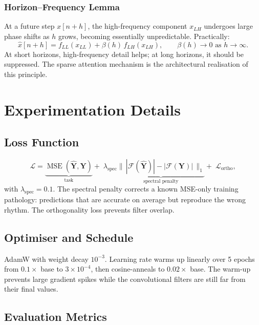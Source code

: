 \documentclass[11pt, letterpaper]{article}
\begin{document}
\subsubsection*{Horizon--Frequency Lemma}
At a future step $x[n+h]$, the high-frequency component $x_{LH}$ undergoes large phase shifts as $h$ grows, becoming essentially unpredictable. Practically:
\begin{equation}
  \hat{x}[n+h] = f_{LL}(x_{LL}) + \beta(h)\,f_{LH}(x_{LH}),
  \qquad \beta(h)\to 0 \text{ as } h\to\infty.
\end{equation}
At short horizons, high-frequency detail helps; at long horizons, it should be suppressed. The sparse attention mechanism is the architectural realisation of this principle.

\section{Experimentation Details}

\subsection{Loss Function}

\begin{equation}
  \mathcal{L} =
    \underbrace{\operatorname{MSE}(\hat{\mathbf{Y}},\mathbf{Y})}_{\text{task}}
    +\; \lambda_{\text{spec}}\underbrace{\bigl\|\,|\mathcal{F}(\hat{\mathbf{Y}})| -
    |\mathcal{F}(\mathbf{Y})|\,\bigr\|_1}_{\text{spectral penalty}}
    +\; \mathcal{L}_{\text{ortho}},
\end{equation}
with $\lambda_{\text{spec}} = 0.1$. The spectral penalty corrects a known MSE-only training pathology: predictions that are accurate on average but reproduce the wrong rhythm. The orthogonality loss prevents filter overlap.

\subsection{Optimiser and Schedule}

AdamW with weight decay $10^{-3}$. Learning rate warms up linearly over 5 epochs from $0.1\times$ base to $3\times10^{-4}$, then cosine-anneals to $0.02\times$ base. The warm-up prevents large gradient spikes while the convolutional filters are still far from their final values.

\subsection{Evaluation Metrics}
\end{document}
